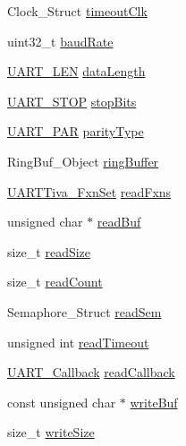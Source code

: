\begin{DoxyCompactItemize}
\begin{tabbing}
\end{tabbing}\item 
Clock\+\_\+\+Struct \hyperlink{struct_u_a_r_t_tiva___object_aff33bf4fef7e0c9d8fa185761d6b8e29}{timeout\+Clk}
\item 
uint32\+\_\+t \hyperlink{struct_u_a_r_t_tiva___object_a9b70a9caca6ee4059e1886b733aab635}{baud\+Rate}
\item 
\hyperlink{_u_a_r_t_8h_adf245d5f10db0abcbd8ad62a0d80c694}{U\+A\+R\+T\+\_\+\+L\+E\+N} \hyperlink{struct_u_a_r_t_tiva___object_a63a7db4358897569e0821047d46d9914}{data\+Length}
\item 
\hyperlink{_u_a_r_t_8h_a176b71ca19bc13d7534fa30fc18c2243}{U\+A\+R\+T\+\_\+\+S\+T\+O\+P} \hyperlink{struct_u_a_r_t_tiva___object_a495473b76204bad3e97b03d62b71a61e}{stop\+Bits}
\item 
\hyperlink{_u_a_r_t_8h_ac70b5aa75500b8c45a51ec560deccfc4}{U\+A\+R\+T\+\_\+\+P\+A\+R} \hyperlink{struct_u_a_r_t_tiva___object_a5ee0f0172431ea525779cc4ada64fdd1}{parity\+Type}
\item 
Ring\+Buf\+\_\+\+Object \hyperlink{struct_u_a_r_t_tiva___object_ac29a91b628eae6391f17a6f993aae7ef}{ring\+Buffer}
\item 
\hyperlink{struct_u_a_r_t_tiva___fxn_set}{U\+A\+R\+T\+Tiva\+\_\+\+Fxn\+Set} \hyperlink{struct_u_a_r_t_tiva___object_a203df3a0b0f8927b802423b867583dc5}{read\+Fxns}
\item 
unsigned char $\ast$ \hyperlink{struct_u_a_r_t_tiva___object_a6e0b10ee6494dd97bf61a8637b69d74e}{read\+Buf}
\item 
size\+\_\+t \hyperlink{struct_u_a_r_t_tiva___object_a9ff3cdeba70a612ccf0c90c1223759d6}{read\+Size}
\item 
size\+\_\+t \hyperlink{struct_u_a_r_t_tiva___object_adcbed405b5985eb7a91d1e111df915b6}{read\+Count}
\item 
Semaphore\+\_\+\+Struct \hyperlink{struct_u_a_r_t_tiva___object_a395f3b54f4968fd8d3dcb1aa0e33bde4}{read\+Sem}
\item 
unsigned int \hyperlink{struct_u_a_r_t_tiva___object_ae40263744e886a1f597592115d0ade21}{read\+Timeout}
\item 
\hyperlink{_u_a_r_t_8h_a44620a9d91e0357ebc6f0a79984d9e1e}{U\+A\+R\+T\+\_\+\+Callback} \hyperlink{struct_u_a_r_t_tiva___object_a600acd9a75fcb9354288b2377b6fc2ad}{read\+Callback}
\item 
const unsigned char $\ast$ \hyperlink{struct_u_a_r_t_tiva___object_ab9518dd737f313e9c4816ffd9ea0de97}{write\+Buf}
\item 
size\+\_\+t \hyperlink{struct_u_a_r_t_tiva___object_adeca1fb4e60ad664300a0362700d33d7}{write\+Size}

\end{DoxyCompactItemize}
